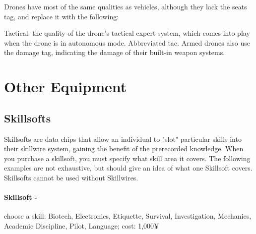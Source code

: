 Drones have most of the same qualities as vehicles, although they lack the seats tag, and replace it with the following:

Tactical: the quality of the drone’s tactical expert system, which comes into play when the drone is in autonomous mode. Abbreviated tac.
Armed drones also use the damage tag, indicating the damage of their built-in weapon systems.




\section{Other Equipment}

\subsection{Skillsofts}
Skillsofts are data chips that allow an individual to "slot" particular skills into their \refname{skillwire} system, gaining the benefit of the prerecorded knowledge. When you purchase a skillsoft, you must specify what skill area it covers. The following examples are not exhaustive, but should give an idea of what one Skillsoft covers. Skillsofts cannot be used without Skillwires.

\paragraph{Skillsoft -} choose a skill: Biotech, Electronics, Etiquette, Survival, Investigation, Mechanics, Academic Discipline, Pilot, Language; cost: 1,000¥


